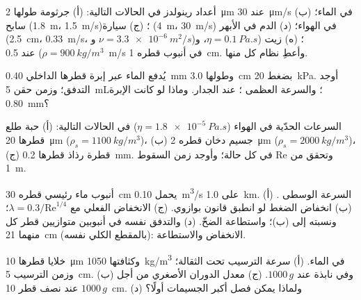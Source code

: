 \begin{exercise}[$\star$]\label{exo:b2:viscous-flows:2}
أعداد رينولدز في الحالات التالية: (أ) جرثومة طولها \qty{2}{\micro m} عند \qty{30}{\micro m/s} في
الماء؛ (ب) سابح (\qty{1.8}{m}، \qty{1.5}{m/s})؛ (ج) سيارة (\qty{4}{m}،
\qty{30}{m/s}) في الهواء؛ (د) الدم في الأبهر (\qty{2.5}{cm}، \qty{0.33}{m/s}،
و $\nu = \qty{3.3e-6}{m^2/s}$)؛ (ه) زيت ($\eta = \qty{0.1}{Pa.s}$، و $\rho =
\qty{900}{kg/m^3}$) عند \qty{0.5}{m/s} في أنبوب قطره \qty{1}{cm}. وأعطِ نظام كل منها.
\end{exercise}

\begin{exercise}[$\star$]\label{exo:b2:viscous-flows:3}
يُدفع الماء عبر إبرة قطرها الداخلي \qty{0.40}{mm} وطولها \qty{3.0}{cm}
بضغط \qty{20}{kPa}. أوجد التدفق؛ وزمن حقن \qty{5}{mL}؛ والسرعة العظمى
؛  عند الجدار. وماذا لو كانت الإبرة \qty{0.80}{mm}؟
\end{exercise}

\begin{exercise}[$\star$]\label{exo:b2:viscous-flows:4}
السرعات الحدّية في الهواء ($\eta = \qty{1.8e-5}{Pa.s}$) في الحالات التالية: (أ) حبة طلع
قطرها \qty{20}{\micro m} ($\rho_s = \qty{1100}{kg/m^3}$)، (ب) جسيم دخان
قطره \qty{2}{\micro m} ($\rho_s = \qty{2000}{kg/m^3}$)، (ج) قطرة رذاذ قطرها \qty{0.2}{mm}.
وتحقق من $\mathrm{Re}$ في كل حالة؛ وأوجد زمن السقوط \qty{1}{m}.
\end{exercise}

\begin{exercise}[$\star\star$]\label{exo:b2:viscous-flows:5}
أنبوب ماء رئيسي قطره \qty{30}{cm} يحمل \qty{0.10}{m^3/s} على
\qty{1.0}{km}. (أ) السرعة الوسطى . (ب) انخفاض الضغط لو
انطبق قانون بوازوي. (ج) الانخفاض الفعلي مع $\lambda = 0.3/\mathrm{Re}^{1/4}$؛
ونسبته إلى (ب)؛ واستطاعة الضخّ. (د) والتدفق نفسه في أنبوبين
متوازيين قطر كل منهما \qty{21}{cm} (بالمقطع الكلي نفسه): الانخفاض والاستطاعة.
\end{exercise}

\begin{exercise}[$\star\star$]\label{exo:b2:viscous-flows:6}
خلايا قطرها \qty{10}{\micro m} وكثافتها \qty{1050}{kg/m^3} في الماء.
(أ) سرعة الترسيب تحت الثقالة؛ وزمن الترسيب \qty{5}{cm}. (ب) وفي
نابذة عند $1000\,g$. (ج) معدل الدوران الأصغري من أجل $1000\,g$ عند
نصف قطر \qty{10}{cm}. (د) ولماذا يمكن فصل أكبر الجسيمات أولًا؟
\end{exercise}

